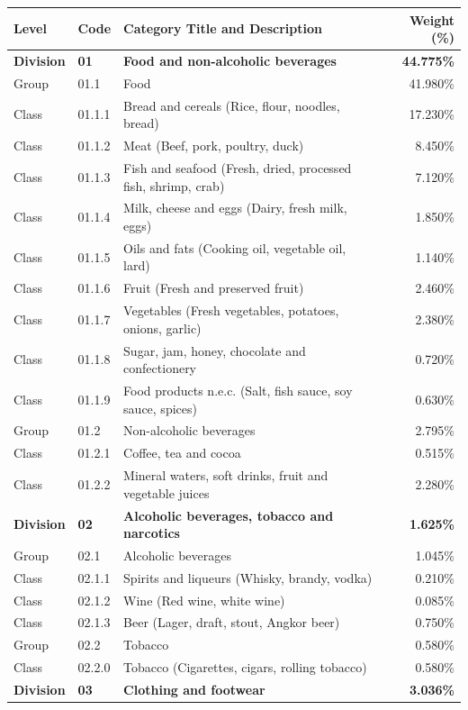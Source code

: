 \documentclass[11pt,a4paper,oneside]{article}
\begin{document}
\begin{longtable}{llp{7.5cm}r}
\toprule
\textbf{Level} & \textbf{Code} & \textbf{Category Title and Description} & \textbf{Weight (\%)} \\
\midrule
\endhead
\textbf{Division} & \textbf{01} & \textbf{Food and non-alcoholic beverages} & \textbf{44.775\%} \\
Group & 01.1 & Food & 41.980\% \\
Class & 01.1.1 & Bread and cereals (Rice, flour, noodles, bread) & 17.230\% \\
Class & 01.1.2 & Meat (Beef, pork, poultry, duck) & 8.450\% \\
Class & 01.1.3 & Fish and seafood (Fresh, dried, processed fish, shrimp, crab) & 7.120\% \\
Class & 01.1.4 & Milk, cheese and eggs (Dairy, fresh milk, eggs) & 1.850\% \\
Class & 01.1.5 & Oils and fats (Cooking oil, vegetable oil, lard) & 1.140\% \\
Class & 01.1.6 & Fruit (Fresh and preserved fruit) & 2.460\% \\
Class & 01.1.7 & Vegetables (Fresh vegetables, potatoes, onions, garlic) & 2.380\% \\
Class & 01.1.8 & Sugar, jam, honey, chocolate and confectionery & 0.720\% \\
Class & 01.1.9 & Food products n.e.c. (Salt, fish sauce, soy sauce, spices) & 0.630\% \\
Group & 01.2 & Non-alcoholic beverages & 2.795\% \\
Class & 01.2.1 & Coffee, tea and cocoa & 0.515\% \\
Class & 01.2.2 & Mineral waters, soft drinks, fruit and vegetable juices & 2.280\% \\
\midrule
\textbf{Division} & \textbf{02} & \textbf{Alcoholic beverages, tobacco and narcotics} & \textbf{1.625\%} \\
Group & 02.1 & Alcoholic beverages & 1.045\% \\
Class & 02.1.1 & Spirits and liqueurs (Whisky, brandy, vodka) & 0.210\% \\
Class & 02.1.2 & Wine (Red wine, white wine) & 0.085\% \\
Class & 02.1.3 & Beer (Lager, draft, stout, Angkor beer) & 0.750\% \\
Group & 02.2 & Tobacco & 0.580\% \\
Class & 02.2.0 & Tobacco (Cigarettes, cigars, rolling tobacco) & 0.580\% \\
\midrule
\textbf{Division} & \textbf{03} & \textbf{Clothing and footwear} & \textbf{3.036\%} \\

\end{longtable}
\end{document}
